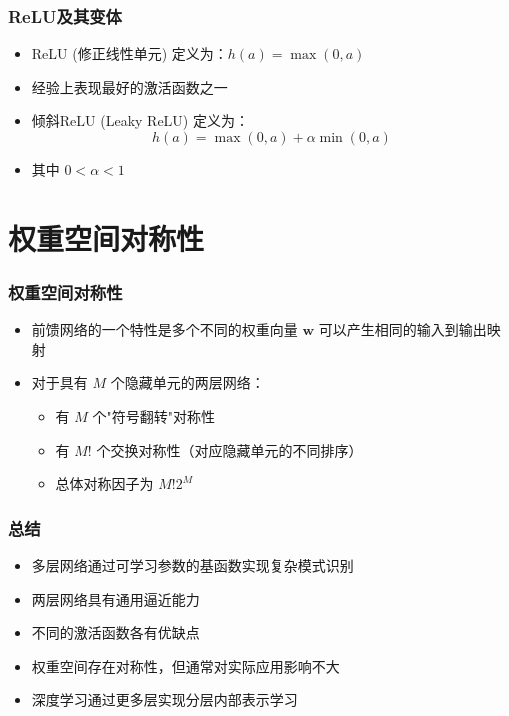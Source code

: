 \documentclass[t,aspectratio=169]{beamer} %
\begin{document}
\begin{frame}
\frametitle{ReLU及其变体}
\begin{itemize}
    \item ReLU (修正线性单元) 定义为：$h(a) = \max(0, a)$
    \item 经验上表现最好的激活函数之一
    \item 倾斜ReLU (Leaky ReLU) 定义为：
    \[
    h(a) = \max(0, a) + \alpha \min(0, a)
    \]
    \item 其中 $0 < \alpha < 1$
\end{itemize}
\end{frame}

\section{权重空间对称性}
\begin{frame}
\frametitle{权重空间对称性}
\begin{itemize}
    \item 前馈网络的一个特性是多个不同的权重向量 $\mathbf{w}$ 可以产生相同的输入到输出映射
    \item 对于具有 $M$ 个隐藏单元的两层网络：
    \begin{itemize}
        \item 有 $M$ 个"符号翻转"对称性
        \item 有 $M!$ 个交换对称性（对应隐藏单元的不同排序）
        \item 总体对称因子为 $M! 2^M$
    \end{itemize}
\end{itemize}
\end{frame}

\begin{frame}
\frametitle{总结}
\begin{itemize}
    \item 多层网络通过可学习参数的基函数实现复杂模式识别
    \item 两层网络具有通用逼近能力
    \item 不同的激活函数各有优缺点
    \item 权重空间存在对称性，但通常对实际应用影响不大
    \item 深度学习通过更多层实现分层内部表示学习
\end{itemize}
\end{frame}
\end{document}
